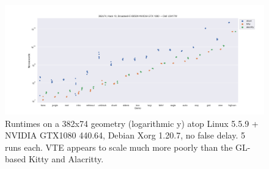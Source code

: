 \begin{figure}[!htb]
\centering
\includegraphics[width=1\textwidth]{media/d0-large-nvidia.png}
\caption[382x74 NVIDIA GTX 1080 benchmarks.]{Runtimes on a 382x74 geometry (logarithmic y) atop Linux 5.5.9 + NVIDIA GTX1080 440.64, Debian Xorg 1.20.7, no false delay. 5 runs each. VTE appears to scale much more poorly than the GL-based Kitty and Alacritty.}
\label{fig:nvidia-full}
\end{figure}
